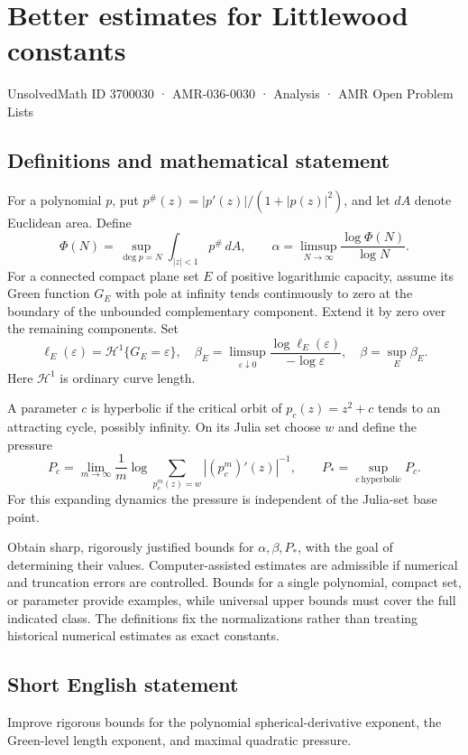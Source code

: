 \documentclass[11pt,a4paper]{article}
\begin{document}
\section*{Better estimates for Littlewood constants}\label{3700030}
{\small UnsolvedMath ID 3700030 · AMR-036-0030 · Analysis · AMR Open Problem Lists}
\subsection{Definitions and mathematical statement}
For a polynomial $p$, put $p^\#(z)=|p'(z)|/(1+|p(z)|^2)$,
and let $dA$ denote Euclidean area. Define
\[
 \Phi(N)=\sup_{\deg p=N}\int_{|z|<1}p^\#\,dA,
 \qquad \alpha=\limsup_{N\to\infty}\frac{\log\Phi(N)}{\log N}.
\]
For a connected compact plane set $E$ of positive
logarithmic capacity, assume its Green function $G_E$
with pole at infinity tends continuously to zero
at the boundary of the unbounded complementary component.
Extend it by zero over the remaining components.
Set
\[
 \ell_E(\varepsilon)=\mathcal H^1\{G_E=\varepsilon\},
 \quad \beta_E=\limsup_{\varepsilon\downarrow0}
             \frac{\log\ell_E(\varepsilon)}{-\log\varepsilon},
 \quad \beta=\sup_E\beta_E .
\]
Here $\mathcal H^1$ is ordinary curve length.

A parameter $c$ is hyperbolic if the critical orbit
of $p_c(z)=z^2+c$ tends to an attracting cycle,
possibly infinity. On its Julia set choose $w$
and define the pressure
\[
 P_c=\lim_{m\to\infty}\frac1m
       \log\sum_{p_c^m(z)=w}|(p_c^m)'(z)|^{-1},
 \qquad P_*=\sup_{c\ \mathrm{hyperbolic}}P_c.
\]
For this expanding dynamics the pressure is independent
of the Julia-set base point.

Obtain sharp, rigorously justified bounds for
$\alpha,\beta,P_*$, with the goal of determining
their values. Computer-assisted estimates are admissible
if numerical and truncation errors are controlled.
Bounds for a single polynomial, compact set, or
parameter provide examples, while universal upper
bounds must cover the full indicated class. The
definitions fix the normalizations rather than treating
historical numerical estimates as exact constants.
\subsection{Short English statement}
Improve rigorous bounds for the polynomial spherical-derivative exponent, the Green-level length exponent, and maximal quadratic pressure.
\end{document}
